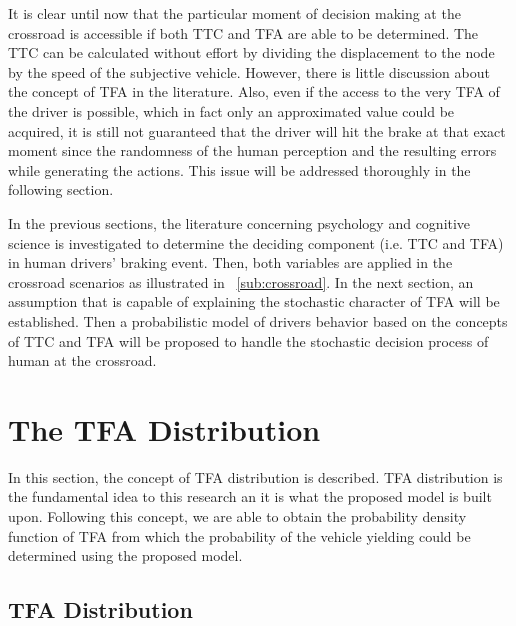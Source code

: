 It is clear until now that the particular moment of decision making at the crossroad is accessible if both TTC and TFA are able to be determined. The TTC can be calculated without effort by dividing the displacement to the node by the speed of the subjective vehicle. However, there is little discussion about the concept of TFA in the literature. Also, even if the access to the very TFA of the driver is possible, which in fact only an approximated value could be acquired, it is still not guaranteed that the driver will hit the brake at that exact moment since the randomness of the human perception and the resulting errors while generating the actions. This issue will be addressed thoroughly in the following section.

In the previous sections, the literature concerning psychology and cognitive science is investigated to determine the deciding component (i.e. TTC and TFA) in human drivers' braking event. Then, both variables are applied in the crossroad scenarios as illustrated in ~\ref{sub:crossroad}. In the next section, an assumption that is capable of explaining the stochastic character of TFA will be established. Then a probabilistic model of drivers behavior based on the concepts of TTC and TFA will be proposed to handle the stochastic decision process of human at the crossroad. 


\section{ The TFA Distribution}
\label{sec:TFADistribution}
In this section, the concept of TFA distribution is described. TFA distribution is the fundamental idea to this research an it is what the proposed model is built upon. Following this concept, we are able to obtain the probability density function of TFA from which the probability of the vehicle yielding could be determined using the proposed model.

\subsection{TFA Distribution}
\label{sub:TFA Distribution}

